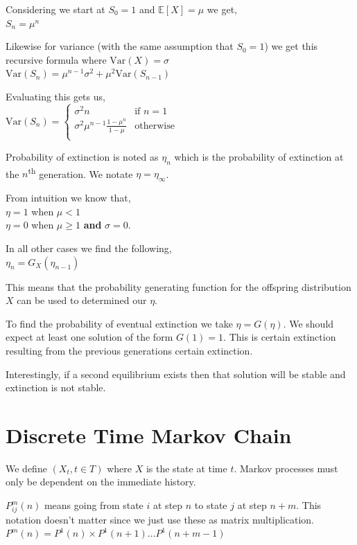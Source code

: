 \documentclass[10pt,landscape,a4paper]{article}
\begin{document}
\begin{multicols*}{4}
Considering we start at $S_0 = 1$ and $\mathbb{E}[X] = \mu$ we get, \\
$S_n = \mu^n$

Likewise for variance (with the same assumption that $S_0 = 1$) we get this
recursive formula where $\text{Var}(X) = \sigma$ \\
$\text{Var}(S_n) = \mu^{n-1} \sigma^2 + \mu^2 \text{Var}(S_{n-1})$

Evaluating this gets us, \\
$\text{Var}(S_n) =
\begin{cases}
\sigma^2 n & \text{if } n = 1 \\
\sigma^2 \mu^{n-1} \frac{1-\mu^n}{1-\mu} & \text{otherwise} \\
\end{cases}$

Probability of extinction is noted as $\eta_n$ which is the probability of
extinction at the $n$\textsuperscript{th} generation. We notate $\eta = \eta_\infty$.

From intuition we know that, \\
$\eta = 1$ when $\mu < 1$ \\
$\eta = 0$ when $\mu \geq 1$ \textbf{and} $\sigma = 0$.

In all other cases we find the following, \\
$\eta_n = G_X(\eta_{n-1})$

This means that the probability generating function for the offspring
distribution $X$ can be used to determined our $\eta$.

To find the probability of eventual extinction we take $\eta = G(\eta)$.
We should expect at least one solution of the form $G(1) = 1$. This is 
certain extinction resulting from the previous generations certain
extinction.

Interestingly, if a second equilibrium exists then that solution will be
stable and extinction is not stable.
\section{Discrete Time Markov Chain}
We define $(X_t, t\in T)$ where $X$ is the state at time $t$.
Markov processes must only be dependent on the immediate history.

$P_{ij}^m(n)$ means going from state $i$ at step $n$ to state $j$ at step $n+m$.
This notation doesn't matter since we just use these as matrix
multiplication. \\
$P^m(n) = P^1(n) \times P^1(n+1) \ldots P^1(n+m-1)$


\end{multicols*}
\end{document}
